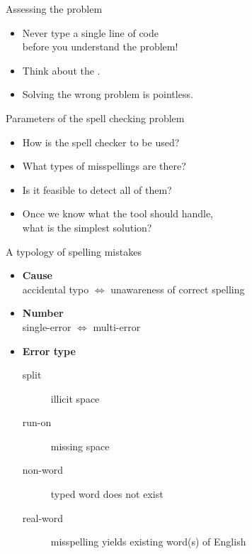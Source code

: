 \documentclass[professionalfonts, xcolor={usenames,svgnames,x11names,table}]{beamer}
\begin{document}
\begin{frame}{Assessing the problem}
    \begin{itemize}
        \item Never type a single line of code\\
              before you understand the problem!
        \item Think about the .
        \item Solving the wrong problem is pointless.
    \end{itemize}
    \pause
    \begin{block}{Parameters of the spell checking problem}
        \begin{itemize}
            \item How is the spell checker to be used?\\
            \item What types of misspellings are there?
            \item Is it feasible to detect all of them?
            \item Once we know what the tool should handle,\\
                what is the simplest solution?
        \end{itemize}
    \end{block}
\end{frame}

\begin{frame}{A typology of spelling mistakes}
    \begin{itemize}
        \item \textbf{Cause}\\
            accidental typo $\Leftrightarrow$ unawareness of correct spelling
        \item \textbf{Number}\\
            single-error $\Leftrightarrow$ multi-error
        \item \textbf{Error type}
            \begin{description}
                \item[split] illicit space\\
                \item[run-on] missing space\\
                \item[non-word] typed word does not exist\\ 
                \item[real-word] misspelling yields existing word(s) of English\\
            \end{description}
    \end{itemize}
\end{frame}
\end{document}
